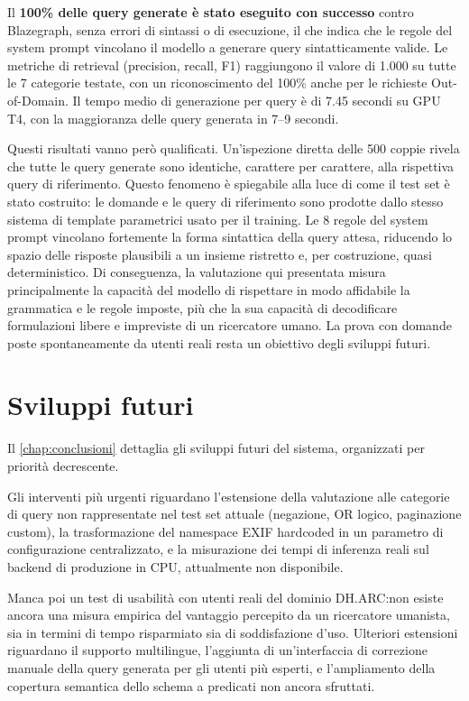 Il \textbf{100\% delle query generate è stato eseguito con successo} contro Blazegraph, senza errori di sintassi o di esecuzione, il che indica che le regole del system prompt vincolano il modello a generare query sintatticamente valide. Le metriche di retrieval (precision, recall, F1) raggiungono il valore di 1.000 su tutte le 7 categorie testate, con un riconoscimento del 100\% anche per le richieste Out-of-Domain. Il tempo medio di generazione per query è di 7.45 secondi su GPU T4, con la maggioranza delle query generata in 7--9 secondi.

Questi risultati vanno però qualificati. Un'ispezione diretta delle 500 coppie rivela che tutte le query generate sono identiche, carattere per carattere, alla rispettiva query di riferimento. Questo fenomeno è spiegabile alla luce di come il test set è stato costruito: le domande e le query di riferimento sono prodotte dallo stesso sistema di template parametrici usato per il training. Le 8 regole del system prompt vincolano fortemente la forma sintattica della query attesa, riducendo lo spazio delle risposte plausibili a un insieme ristretto e, per costruzione, quasi deterministico. Di conseguenza, la valutazione qui presentata misura principalmente la capacità del modello di rispettare in modo affidabile la grammatica e le regole imposte, più che la sua capacità di decodificare formulazioni libere e impreviste di un ricercatore umano. La prova con domande poste spontaneamente da utenti reali resta un obiettivo degli sviluppi futuri.

\section{Sviluppi futuri}\label{sec:sviluppi_intro}

Il \cref{chap:conclusioni} dettaglia gli sviluppi futuri del sistema, organizzati per priorità decrescente.

Gli interventi più urgenti riguardano l'estensione della valutazione alle categorie di query non rappresentate nel test set attuale (negazione, OR logico, paginazione custom), la trasformazione del namespace EXIF hardcoded in un parametro di configurazione centralizzato, e la misurazione dei tempi di inferenza reali sul backend di produzione in CPU, attualmente non disponibile.

Manca poi un test di usabilità con utenti reali del dominio DH.ARC:\@ non esiste ancora una misura empirica del vantaggio percepito da un ricercatore umanista, sia in termini di tempo risparmiato sia di soddisfazione d'uso. Ulteriori estensioni riguardano il supporto multilingue, l'aggiunta di un'interfaccia di correzione manuale della query generata per gli utenti più esperti, e l'ampliamento della copertura semantica dello schema a predicati non ancora sfruttati.

